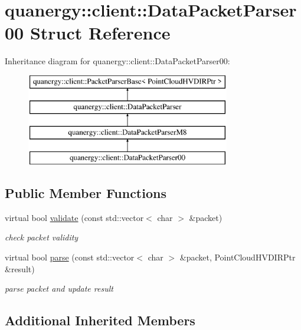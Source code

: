 \hypertarget{structquanergy_1_1client_1_1DataPacketParser00}{\section{quanergy\-:\-:client\-:\-:Data\-Packet\-Parser00 Struct Reference}
\label{structquanergy_1_1client_1_1DataPacketParser00}
}
Inheritance diagram for quanergy\-:\-:client\-:\-:Data\-Packet\-Parser00\-:\begin{figure}[H]
\begin{center}
\leavevmode
\includegraphics[height=4.000000cm]{structquanergy_1_1client_1_1DataPacketParser00}
\end{center}
\end{figure}
\subsection*{Public Member Functions}
\begin{DoxyCompactItemize}
\item 
virtual bool \hyperlink{structquanergy_1_1client_1_1DataPacketParser00_ac161241641118826d0514d293f7d6538}{validate} (const std\-::vector$<$ char $>$ \&packet)
\begin{DoxyCompactList}\small\item\em check packet validity \end{DoxyCompactList}\item 
virtual bool \hyperlink{structquanergy_1_1client_1_1DataPacketParser00_aceab95c7e5553724883adad72485d080}{parse} (const std\-::vector$<$ char $>$ \&packet, Point\-Cloud\-H\-V\-D\-I\-R\-Ptr \&result)
\begin{DoxyCompactList}\small\item\em parse packet and update result \end{DoxyCompactList}\end{DoxyCompactItemize}
\subsection*{Additional Inherited Members}


